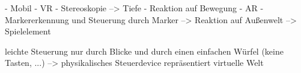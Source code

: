 

- Mobil
- VR
		- Stereoskopie --> Tiefe
		- Reaktion auf Bewegung
- AR
		- Markererkennung und Steuerung durch Marker --> Reaktion auf Außenwelt
		--> Spielelement
		
		
		leichte Steuerung nur durch Blicke und durch einen einfachen Würfel (keine Tasten, ...) 
		--> physikalisches Steuerdevice repräsentiert virtuelle Welt
		
		
		
